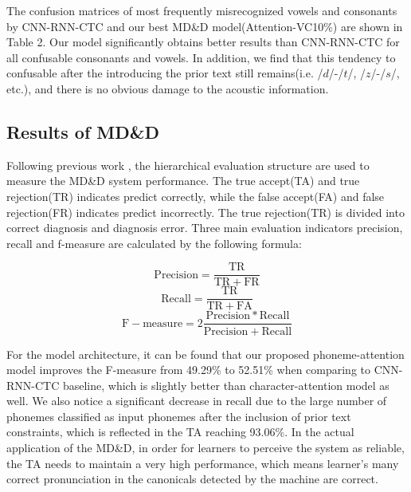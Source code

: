 \documentclass[a4paper]{article}
\begin{document}
The confusion matrices of most frequently misrecognized vowels and consonants by CNN-RNN-CTC and our best MD\&D model(Attention-VC10\%) are shown in Table 2.  Our model significantly obtains better results than CNN-RNN-CTC for all confusable consonants and vowels. In addition, we find that this tendency to confusable after the introducing the prior text still remains(i.e. /$d$/-/$t$/, /$z$/-/$s$/, etc.), and there is no obvious damage to the acoustic information.


\subsection{Results of MD\&D}

Following previous work \cite{leung2019cnn,li2016mispronunciation}, the hierarchical evaluation structure are used to measure the MD\&D system performance. The true accept(TA) and true rejection(TR) indicates predict correctly, while the false accept(FA) and false rejection(FR) indicates predict incorrectly. The true rejection(TR) is divided into correct diagnosis and diagnosis error. Three main evaluation indicators precision, recall and f-measure are calculated by the following formula:

\begin{equation}
    \mathrm{Precision = \frac{TR}{TR+FR}} \label{eq:precision}
\end{equation}
\begin{equation}
    \mathrm{Recall = \frac{TR}{TR+FA}} \label{eq:recall}
\end{equation}
\begin{equation}
    \mathrm{F-}\mathrm{measure = 2\frac{Precision*Recall}{Precision+Recall}} \label{eq:f1}
\end{equation}


For the model architecture, it can be found that our proposed phoneme-attention model improves the F-measure from 49.29\% to 52.51\% when comparing to CNN-RNN-CTC baseline, which is slightly better than character-attention model as well. We also notice a significant decrease in recall due to the large number of phonemes classified as input phonemes after the inclusion of prior text constraints, which is reflected in the TA reaching 93.06\%. In the actual application of the MD\&D, in order for learners to perceive the system as reliable, the TA needs to maintain a very high performance, which means learner's many correct pronunciation in the canonicals detected by the machine are correct.  
\end{document}

